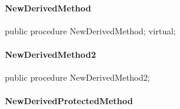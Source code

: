 \documentclass{report}
\newif\ifpdf
\begin{document}
\paragraph*{NewDerivedMethod}\hspace*{\fill}

\label{ok_inherited_members.TNewDerived-NewDerivedMethod}
\begin{list}{}{
\setlength{\itemindent}{0cm}
\setlength{\listparindent}{0cm}
\setlength{\leftmargin}{\evensidemargin}
\addtolength{\leftmargin}{\tmplength}
\settowidth{\labelsep}{X}
\addtolength{\leftmargin}{\labelsep}
\setlength{\labelwidth}{\tmplength}
}
\item[\textbf{Declaration}\hfill]
\ifpdf
\begin{flushleft}
\fi
\begin{ttfamily}
public procedure NewDerivedMethod; virtual;\end{ttfamily}

\ifpdf
\end{flushleft}
\fi

\end{list}
\paragraph*{NewDerivedMethod2}\hspace*{\fill}

\label{ok_inherited_members.TNewDerived-NewDerivedMethod2}
\begin{list}{}{
\setlength{\itemindent}{0cm}
\setlength{\listparindent}{0cm}
\setlength{\leftmargin}{\evensidemargin}
\addtolength{\leftmargin}{\tmplength}
\settowidth{\labelsep}{X}
\addtolength{\leftmargin}{\labelsep}
\setlength{\labelwidth}{\tmplength}
}
\item[\textbf{Declaration}\hfill]
\ifpdf
\begin{flushleft}
\fi
\begin{ttfamily}
public procedure NewDerivedMethod2;\end{ttfamily}

\ifpdf
\end{flushleft}
\fi

\end{list}
\paragraph*{NewDerivedProtectedMethod}\hspace*{\fill}
\end{document}
